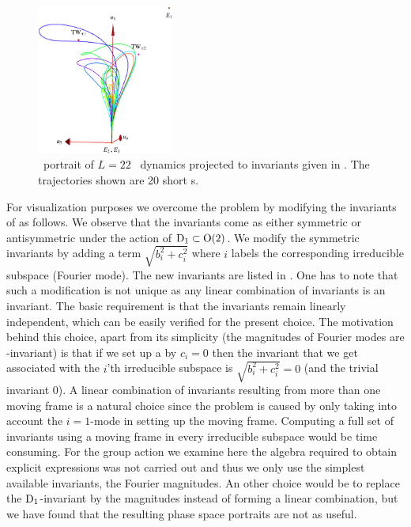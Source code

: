\begin{figure}[t]
\begin{center}
\includegraphics[width=0.4\textwidth, clip=true]{../figs/ksSO2inv145eqbTo0}
\end{center}
\caption[\KS\  reduced \statesp, modified invariants]
   {\Statesp\ portrait of $L=22$ \KS\ dynamics projected to
   invariants given in . The trajectories
   shown are 20 short \rpo s. }
\label{fig:ksSO2eqbTo0}
\end{figure}

For visualization purposes we overcome the problem by modifying
the invariants of  as follows. We observe
that the invariants come as either symmetric or antisymmetric
under the action of $\mathrm{D}_{1}\subset\mathrm{O}(2)$. We modify the
symmetric invariants by adding a term $\sqrt{b_i^2+c_i^2}$
where $i$ labels the corresponding irreducible subspace  (Fourier
mode). The new invariants are listed in
.
One has to note that such a modification is not unique as any
linear combination of invariants is an invariant. The basic
requirement is that the invariants remain linearly
independent, which can be easily verified for the present
choice. The motivation behind this choice, apart from its
simplicity (the magnitudes of Fourier modes are -invariant) is
that if we set up a {\csection} by $c_i=0$ then the
invariant that we get associated with the $i$'th irreducible
subspace is $\sqrt{b_i^2+c_i^2}=0$ (and the trivial invariant
$0$). A linear combination of invariants resulting from more
than one moving frame is a natural choice since the problem
is caused by only taking into account the $i=1$-mode in
setting up the moving frame. Computing a full set of
invariants using a moving frame in every irreducible subspace
would be time consuming. For the group action we examine here
the algebra required to obtain explicit expressions was not
carried out
and thus we only use the simplest available invariants, the
Fourier magnitudes. An other choice would be to replace the
$\mathrm{D}_{1}$-invariant by the  magnitudes instead of forming a
linear combination, but we have found that the resulting
phase space portraits are not as useful.


